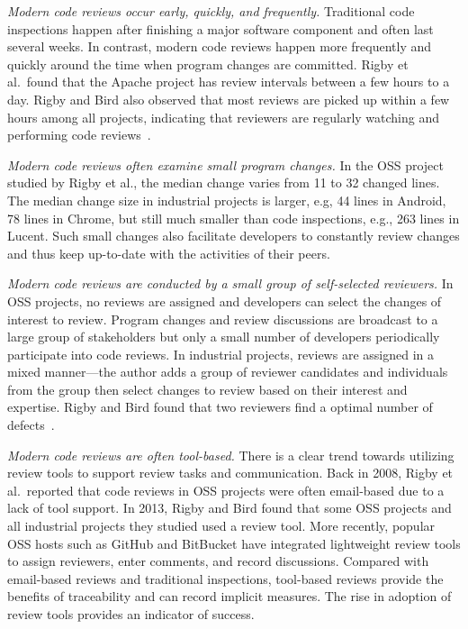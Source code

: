 \documentclass[runningheads,a4paper]{llncs}
\begin{document}
{\it Modern code reviews occur early, quickly, and frequently.} Traditional code inspections happen after finishing a major software component and often last several weeks. In contrast, modern code reviews happen more frequently and quickly around the time when program changes are committed. Rigby et al.~found that the Apache project has review intervals between a few hours to a day. Rigby and Bird also observed that most reviews are picked up within a few hours among all projects, indicating that reviewers are regularly watching and performing code reviews~\cite{rigby2013convergent}.

{\it Modern code reviews often examine small program changes.} In the OSS project studied by Rigby et al., the median change varies from 11 to 32 changed lines. The median change size in industrial projects is larger, e.g, 44 lines in Android, 78 lines in Chrome, but still much smaller than code inspections, e.g., 263 lines in Lucent. Such small changes also facilitate developers to constantly review changes and thus keep up-to-date with the activities of their peers. 

{\it Modern code reviews are conducted by a small group of self-selected reviewers.} 
In OSS projects, no reviews are assigned and developers can select the changes of interest to review. Program changes and review discussions are broadcast to a large group of stakeholders but only a small number of developers periodically participate into code reviews. In industrial projects, reviews are assigned in a mixed manner---the author adds a group of reviewer candidates and individuals from the group then select changes to review based on their interest and expertise. Rigby and Bird found that two reviewers find a optimal number of defects~\cite{rigby2013convergent}.

{\it Modern code reviews are often tool-based.} There is a clear trend towards utilizing review tools to support review tasks and communication. Back in 2008, Rigby et al.~reported that code reviews in OSS projects were often email-based due to a lack of tool support. In 2013, Rigby and Bird found that some OSS projects and all industrial projects they studied used a review tool. More recently, popular OSS hosts such as GitHub and BitBucket have integrated lightweight review tools to assign reviewers, enter comments, and record discussions. Compared with email-based reviews and traditional inspections, tool-based reviews provide the benefits of traceability and can record implicit measures. The rise in adoption of review tools provides an indicator of success.
\end{document}

